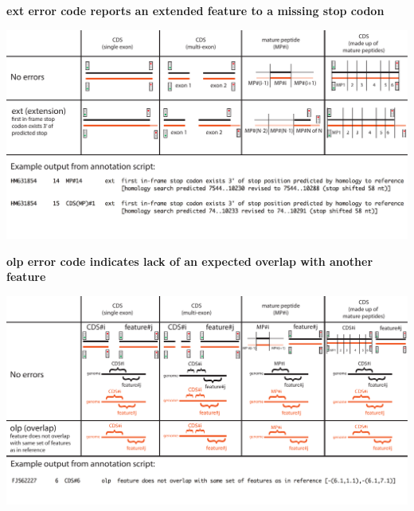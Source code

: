 \documentclass[landscape]{slides}
\begin{document}
\begin{slide}
\begin{center}
\textbf{ext error code reports an extended feature to a missing stop codon}
\vspace{0.5in}

\includegraphics[width=10in]{figs/errornew-2-ext}
\end{center}
\vfill
\end{slide}
\begin{slide}
\begin{center}
\textbf{olp error code indicates lack of an expected overlap with
  another feature}
\vspace{0.5in}

\includegraphics[width=10in]{figs/errornew-3-olp}
\end{center}
\vfill
\end{slide}
\end{document}
